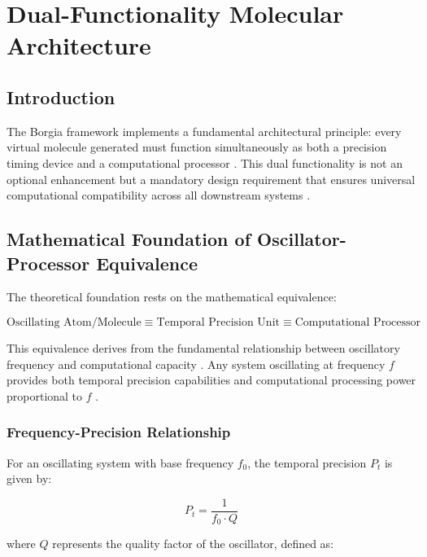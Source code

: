 \section{Dual-Functionality Molecular Architecture}

\subsection{Introduction}

The Borgia framework implements a fundamental architectural principle: every virtual molecule generated must function simultaneously as both a precision timing device and a computational processor \cite{sachikonye2024oscillatory}. This dual functionality is not an optional enhancement but a mandatory design requirement that ensures universal computational compatibility across all downstream systems \cite{sterling2015principles}.

\subsection{Mathematical Foundation of Oscillator-Processor Equivalence}

The theoretical foundation rests on the mathematical equivalence:

\begin{equation}
\text{Oscillating Atom/Molecule} \equiv \text{Temporal Precision Unit} \equiv \text{Computational Processor}
\end{equation}

This equivalence derives from the fundamental relationship between oscillatory frequency and computational capacity \cite{landauer1961irreversibility}. Any system oscillating at frequency $f$ provides both temporal precision capabilities and computational processing power proportional to $f$ \cite{lloyd2000ultimate}.

\subsubsection{Frequency-Precision Relationship}

For an oscillating system with base frequency $f_0$, the temporal precision $P_t$ is given by:

\begin{equation}
P_t = \frac{1}{f_0 \cdot Q}
\end{equation}

where $Q$ represents the quality factor of the oscillator, defined as:

